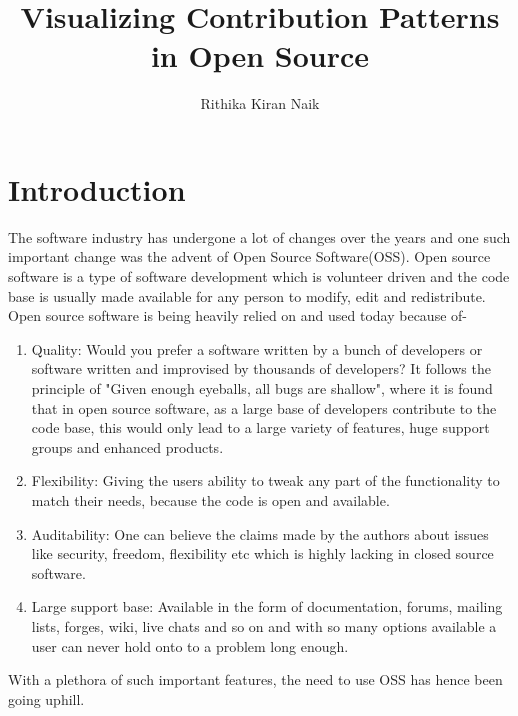 \documentclass[seploa]{beavtex}
\title{Visualizing Contribution Patterns in Open Source}
\author{Rithika Kiran Naik}
\begin{document}
\maketitle

\mainmatter

\chapter{Introduction}
The software industry has undergone a lot of changes over the years and one such important change was the advent of Open Source Software(OSS). Open source software is a type of software development which is volunteer driven\cite{ghosh2005} and the code base is usually made available for any person to modify, edit and redistribute\cite{osdef}. Open source software is being heavily relied on and used today because of-
\begin{enumerate}
\item Quality: Would you prefer a software written by a bunch of developers or software written and improvised by thousands of developers? It follows the principle of "Given enough eyeballs, all bugs are shallow"\cite{linuslaw}, where it is found that in open source software, as a large base of developers contribute to the code base, this would only lead to a large variety of features, huge support groups and enhanced products\cite{pcwr}. 
\item Flexibility: Giving the users ability to tweak any part of the functionality to match their needs, because the code is open and available\cite{pcwr}. 
\item Auditability: One can believe the claims made by the authors about issues like security, freedom, flexibility etc which is highly lacking in closed source software\cite{pcwr}. 
\item Large support base: Available in the form of documentation, forums, mailing lists, forges, wiki, live chats and so on and with so many options available a user can never hold onto to a problem long enough. 
\end{enumerate}
With a plethora of such important features, the need to use OSS has hence been going uphill.
\end{document}
